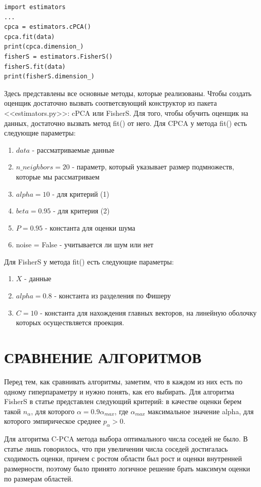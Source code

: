 \documentclass[english, russian]{sobraep}
\begin{document}
\begin{lstlisting}
import estimators
...
cpca = estimators.cPCA()
cpca.fit(data)
print(cpca.dimension_)
fisherS = estimators.FisherS()
fisherS.fit(data)
print(fisherS.dimension_)
\end{lstlisting}

Здесь представлены все основные методы, которые реализованы. Чтобы создать оценщик достаточно вызвать соответсвующий конструктор из пакета <<estimators.py>>: cPCA или FisherS. Для того, чтобы обучить оценщик на данных, достаточно вызвать метод fit() от него.
Для CPCA у метода fit() есть следующие параметры:
\begin{enumerate}
    \item $data$ - рассматриваемые данные
    \item $n\_neighbors = 20$ - параметр, который указывает размер подмножеств, которые мы рассматриваем
    \item $alpha = 10$ - для критерий (1)
    \item $beta = 0.95$ - для критерия (2)
    \item $P = 0.95$ - константа для оценки шума
    \item noise = False - учитывается ли шум или нет
\end{enumerate}

Для FisherS у метода fit() есть следующие параметры:
\begin{enumerate}
    \item $X$ - данные
    \item $alpha = 0.8$ - константа из разделения по Фишеру
    \item $C = 10$ - константа для нахождения главных векторов, на линейную оболочку которых осуществляется проекция.
\end{enumerate}

\section{СРАВНЕНИЕ АЛГОРИТМОВ}
Перед тем, как сравнивать алгоритмы, заметим, что в каждом из них есть по одному гиперпараметру и нужно понять, как его выбирать. Для алгоритма FisherS в статье представлен следующий критерий: в качестве оценки берем такой $n_\alpha$, для которого $\alpha = 0.9\alpha_{max}$, где $\alpha_{max}$ максимальное значение alpha, для которого эмпирическое среднее $p_\alpha > 0$.

Для алгоритма C-PCA метода выбора оптимального числа соседей не было. В статье лишь говорилось, что при увеличении числа соседей достигалась сходимость оценки, причем с ростом области был рост и оценки внутренней размерности, поэтому было принято логичное решение брать максимум оценки по размерам областей.
\end{document}
